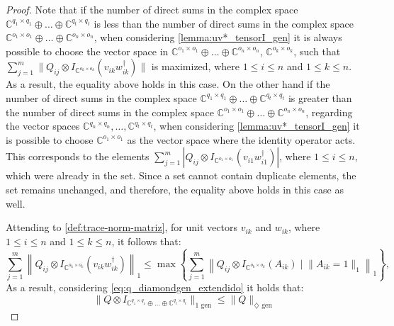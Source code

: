 \begin{proof}
 Note that if the number of direct sums in the complex space $\mathbb{C}^{q_1 \times q_1} \oplus \ldots \oplus \mathbb{C}^{q_t \times q_t}$ is less than the number of direct sums in the complex space $\mathbb{C}^{o_1 \times o_1} \oplus \ldots \oplus \mathbb{C}^{o_n \times o_n}$, when considering \autoref{lemma:uv*_tensorI_gen} it is always possible to choose the vector space in  $\mathbb{C}^{o_1 \times o_1} \oplus \ldots \oplus \mathbb{C}^{o_n \times o_n}$, $\mathbb{C}^{o_k \times o_k}$, such that  $\sum_{j=1}^{m} \|  Q_{ij} \otimes I_{\mathbb{C}^{o_k \times o_k}} (v_{ik} w_{ik}^\dag) \|$ is maximized, where $1 \leq i \leq n$ and $1 \leq k \leq n$. As a result, the equality above holds in this case. On the other hand if the number of direct sums in the complex space $\mathbb{C}^{q_1 \times q_1} \oplus \ldots \oplus \mathbb{C}^{q_t \times q_t}$ is greater than the number of direct sums in the complex space $\mathbb{C}^{o_1 \times o_1} \oplus \ldots \oplus \mathbb{C}^{o_n \times o_n}$,  regarding the vector spaces $\mathbb{C}^{q_n \times q_n} , \ldots, \mathbb{C}^{q_t \times q_t} $, when considering \autoref{lemma:uv*_tensorI_gen} it is possible to choose  $\mathbb{C}^{o_1 \times o_1}$ as the vector space where the identity operator acts. This corresponds to the elements $\sum_{j=1}^{m} | Q_{ij} \otimes I_{\mathbb{C}^{o_1 \times o_1}} (v_{i1} w_{i1}^\dag) |$, where $1 \leq i \leq n$, which were already in the set. Since a set cannot contain duplicate elements, the set remains unchanged, and therefore, the equality above holds in this case as well.

 Attending to \autoref{def:trace-norm-matriz}, for unit vectors $v_{ik}$ and  $w_{ik}$, where  $ 1 \leq i \leq n$ and $ 1 \leq k \leq n$, it follows that:
  \begin{equation}
    \sum_{j=1}^{m} \left\lVert Q_{ij} \otimes I_{\mathbb{C}^{o_k \times o_k}} (v_{ik} w_{ik}^\dag)\right\rVert_{1} \leq \max \left\{ \sum_{j=1}^{m} \left\lVert Q_{ij} \otimes I_{\mathbb{C}^{o_k \times o_k}} (A_{ik}) \mid \lVert A_{ik}=1  \rVert_1 \right\rVert_{1}\right\},
  \end{equation}
   As a result, considering \autoref{eq:q_diamondgen_extendido} it holds that:
  \begin{equation}
    \lVert Q \otimes I_{\mathbb{C}^{q_1 \times q_1} \oplus \ldots \oplus \mathbb{C}^{q_t \times q_t}} \rVert_{1 \text{ gen}} \leq  \lVert Q \rVert_{\diamondsuit \text{ gen}}
  \end{equation}


\end{proof}
